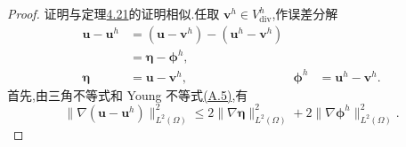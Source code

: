 \begin{proof}
证明与定理\hyperref[thm:stokes-error-velocity-h1]{4.21}的证明相似.任取 $\bm{v}^h\in V_{\mathrm{div}}^h$,作误差分解
\[
\begin{aligned}
 \bm{u}-\bm{u}^h
  &=(\bm{u}-\bm{v}^h)-(\bm{u}^h-\bm{v}^h)\\
  &=\symbf{\eta}-\symbf{\phi}^h,\\
 \symbf{\eta}&=\bm{u}-\bm{v}^h,
 &\symbf{\phi}^h&=\bm{u}^h-\bm{v}^h.
\end{aligned}
\]
首先,由三角不等式和 Young 不等式\hyperref[eq:appendix-a-5]{(A.5)},有
\begin{equation}\label{eq:stokes-grad-div-error-triangle}
 \|\nabla(\bm{u}-\bm{u}^h)\|_{L^2(\Omega)}^2
 \leq 2\|\nabla\symbf{\eta}\|_{L^2(\Omega)}^2
      +2\|\nabla\symbf{\phi}^h\|_{L^2(\Omega)}^2.
\end{equation}


\end{proof}
